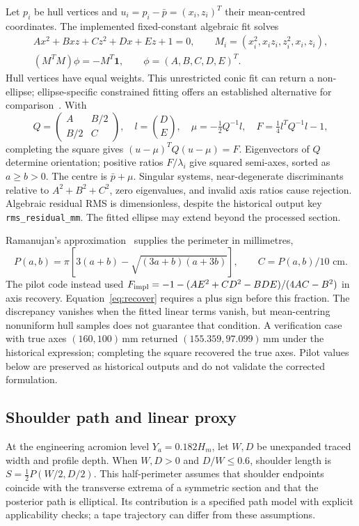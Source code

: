\documentclass[11pt,a4paper]{article}
\begin{document}
Let $p_i$ be hull vertices and $u_i=p_i-\bar p=(x_i,z_i)^T$ their mean-centred coordinates. The implemented fixed-constant algebraic fit solves
\begin{equation}
 \begin{gathered}
 Ax^2+Bxz+Cz^2+Dx+Ez+1=0,\qquad
 M_i=(x_i^2,x_iz_i,z_i^2,x_i,z_i),\\
 (M^TM)\phi=-M^T\mathbf1,\qquad \phi=(A,B,C,D,E)^T.
 \end{gathered}
 \label{eq:fit}
\end{equation}
Hull vertices have equal weights. This unrestricted conic fit can return a non-ellipse; ellipse-specific constrained fitting offers an established alternative for comparison~\cite{fitzgibbon1999direct}. With
\begin{equation}
 Q=\begin{pmatrix}A&B/2\\B/2&C\end{pmatrix},\quad l=\binom DE,
 \quad \mu=-\tfrac12Q^{-1}l,\quad
 F=\tfrac14l^TQ^{-1}l-1,
 \label{eq:recover}
\end{equation}
completing the square gives $(u-\mu)^TQ(u-\mu)=F$. Eigenvectors of $Q$ determine orientation; positive ratios $F/\lambda_i$ give squared semi-axes, sorted as $a\geq b>0$. The centre is $\bar p+\mu$. Singular systems, near-degenerate discriminants relative to $A^2+B^2+C^2$, zero eigenvalues, and invalid axis ratios cause rejection. Algebraic residual RMS is dimensionless, despite the historical output key \texttt{rms\_residual\_mm}. The fitted ellipse may extend beyond the processed section.

Ramanujan's approximation~\cite{ramanujan1914modular} supplies the perimeter in millimetres,
\begin{equation}
 P(a,b)=\pi[3(a+b)-\sqrt{(3a+b)(a+3b)}],\qquad C=P(a,b)/10\text{ cm}.
 \label{eq:perimeter}
\end{equation}
The pilot code instead used $F_{\rm impl}=-1-(AE^2+CD^2-BDE)/(4AC-B^2)$ in axis recovery. Equation~\eqref{eq:recover} requires a plus sign before this fraction. The discrepancy vanishes when the fitted linear terms vanish, but mean-centring nonuniform hull samples does not guarantee that condition. A verification case with true axes $(160,100)$\,mm returned $(155.359,97.099)$\,mm under the historical expression; completing the square recovered the true axes. Pilot values below are preserved as historical outputs and do not validate the corrected formulation.

\subsection{Shoulder path and linear proxy}
At the engineering acromion level $Y_a=0.182H_m$, let $W,D$ be unexpanded traced width and profile depth. When $W,D>0$ and $D/W\leq0.6$, shoulder length is $S=\tfrac12P(W/2,D/2)$. This half-perimeter assumes that shoulder endpoints coincide with the transverse extrema of a symmetric section and that the posterior path is elliptical. Its contribution is a specified path model with explicit applicability checks; a tape trajectory can differ from these assumptions.
\end{document}
